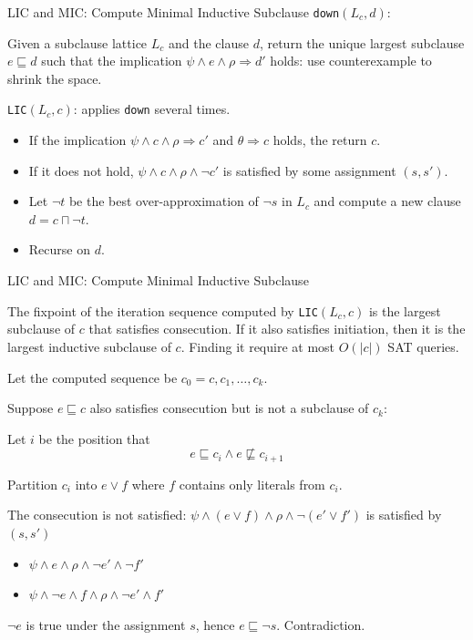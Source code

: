 \documentclass[aspectratio=1610, 13pt]{beamer}
\begin{document}
\begin{frame}{LIC and MIC: Compute Minimal Inductive Subclause}
\texttt{down}$(L_c, d)$:

Given a subclause lattice $L_c$ and the clause $d$, return the unique largest subclause $e\sqsubseteq d$ such that the implication $\psi \wedge e \wedge \rho \Rightarrow d'$ holds: use counterexample to shrink the space.


\texttt{LIC}$(L_c, c)$: applies \texttt{down} several times.
\begin{itemize}
\item If the implication $\psi \wedge c \wedge \rho \Rightarrow c'$ and $\theta \Rightarrow c$ holds, the return $c$.
\item If it does not hold, $\psi\wedge c \wedge \rho \wedge \neg c'$ is satisfied by some assignment $(s, s')$.

\item Let $\neg t$ be the best over-approximation of $\neg s$ in $L_c$ and compute a new clause $d = c \sqcap \neg t$.

\item Recurse on $d$.
\end{itemize}

\end{frame}

\begin{frame}{LIC and MIC: Compute Minimal Inductive Subclause}
\begin{theorem}
The fixpoint of the iteration sequence computed by \texttt{LIC}$(L_c, c)$ is the largest subclause of $c$ that satisfies consecution. If it also satisfies initiation, then it is the largest inductive subclause of $c$. Finding it require at most $O(|c|)$ SAT queries.

\end{theorem}

Let the computed sequence be $c_0 = c, c_1, \ldots , c_k$.

Suppose $e \sqsubseteq c$ also satisfies consecution but is not a subclause of $c_k$:

Let $i$ be the position that 
\[e \sqsubseteq c_i \wedge e \not \sqsubseteq c_{i + 1}\]

Partition $c_i$ into $e\vee f$ where $f$ contains only literals from $c_i$.

The consecution is not satisfied: $\psi \wedge (e\vee f) \wedge \rho \wedge \neg (e' \vee f')$ is satisfied by $(s, s')$
\begin{itemize}
\item $\psi \wedge e \wedge \rho \wedge \neg e' \wedge \neg f'$
\item $\psi \wedge \neg e \wedge f \wedge \rho \wedge \neg e' \wedge f'$
\end{itemize}

$\neg e$ is true under the assignment $s$, hence $e \sqsubseteq \neg s$. Contradiction.
\end{frame}
\end{document}
